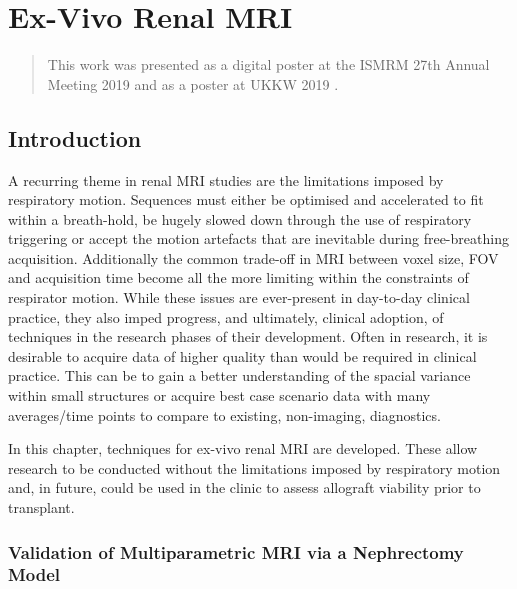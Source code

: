\chapter{Ex-Vivo Renal MRI}
\label{chap:ex}

\begin{abstract}
	This work was presented as a digital poster at the \ac{ISMRM} 27th Annual Meeting 2019 \cite{daniel_effects_2019} and as a poster at \ac{UKKW} 2019 \cite{kazmi_determining_2019}.
\end{abstract}
\acresetall
\newpage
\section{Introduction}

A recurring theme in renal \ac{MRI} studies are the limitations imposed by respiratory motion. Sequences must either be optimised and accelerated to fit within a breath-hold, be hugely slowed down through the use of respiratory triggering or accept the motion artefacts that are inevitable during free-breathing acquisition. Additionally the common trade-off in \ac{MRI} between voxel size, \ac{FOV} and acquisition time become all the more limiting within the constraints of respirator motion. While these issues are ever-present in day-to-day clinical practice, they also imped progress, and ultimately, clinical adoption, of techniques in the research phases of their development. Often in research, it is desirable to acquire data of higher quality than would be required in clinical practice. This can be to gain a better understanding of the spacial variance within small structures or acquire best case scenario data with many averages/time points to compare to existing, non-imaging, diagnostics.

In this chapter, techniques for ex-vivo renal \ac{MRI} are developed. These allow research to be conducted without the limitations imposed by respiratory motion and, in future, could be used in the clinic to assess allograft viability prior to transplant.

\subsection{Validation of Multiparametric MRI via a Nephrectomy Model}

